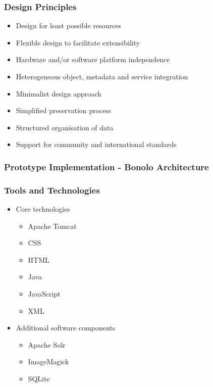\documentclass[xcolor=dvitex,t,11pt]{beamer}
\begin{document}
\begin{frame}[fragile]
\frametitle{Design Principles}
\begin{itemize}
\item Design for least possible resources
\item Flexible design to facilitate extensibility
\item Hardware and/or software platform independence
\item Heterogeneous object, metadata and service integration
\item Minimalist design approach
\item Simplified preservation process
\item Structured organisation of data
\item Support for community and international standards
\end{itemize}

\end{frame}


\begin{frame}[fragile]
\frametitle{Prototype Implementation - Bonolo Architecture}
\begin{figure}
\centering
\framebox[\textwidth]{%

}
\end{figure}
\end{frame}

\begin{frame}[fragile]
\frametitle{Tools and Technologies}
\begin{itemize}
\item Core technologies
\begin{itemize}
\item Apache Tomcat
\item CSS
\item HTML
\item Java
\item JavaScript
\item XML
\end{itemize}
\item Additional software components
\begin{itemize}
\item Apache Solr
\item ImageMagick
\item SQLite
\end{itemize}
\end{itemize}
\end{frame}
\end{document}
